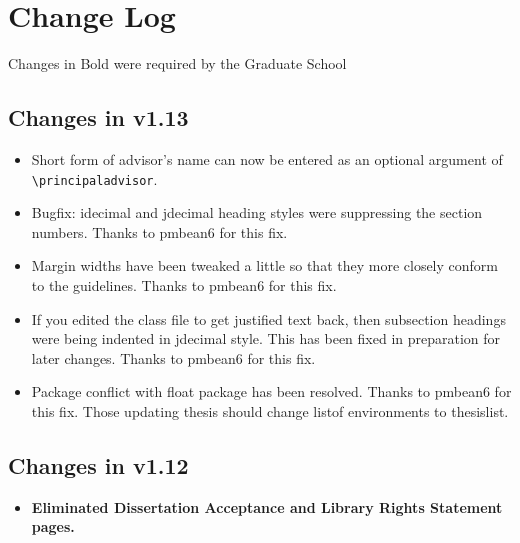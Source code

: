 \chapter{Change Log}
Changes in Bold were required by the Graduate School

\section{Changes in v1.13}
\begin{itemize}
\item{Short form of advisor's name can now be entered as an optional argument of \verb=\principaladvisor=.}
\item{Bugfix: idecimal and jdecimal heading styles were suppressing the section numbers.  Thanks to pmbean6 for this fix.}
\item{Margin widths have been tweaked a little so that they more closely conform to the guidelines.  Thanks to pmbean6 for this fix.}
\item{If you edited the class file to get justified text back, then subsection headings were being indented in jdecimal style.  This has been fixed in preparation for later changes.  Thanks to pmbean6 for this fix.}
\item{Package conflict with float package has been resolved.  Thanks to pmbean6 for this fix.  Those updating thesis should change listof environments to thesislist.}
\end{itemize}

\section{Changes in v1.12}
\begin{itemize}
\item{\bfseries Eliminated Dissertation Acceptance and Library Rights Statement pages.}
\end{itemize}

